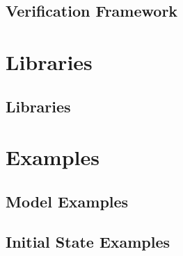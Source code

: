 \documentclass[10pt,oneside]{book}
\begin{document}


\chapter{Verification Framework}



%
%

\part{Libraries}

\chapter{Libraries}




\part{Examples}

\chapter{Model Examples}



\chapter{Initial State Examples}
\end{document}
